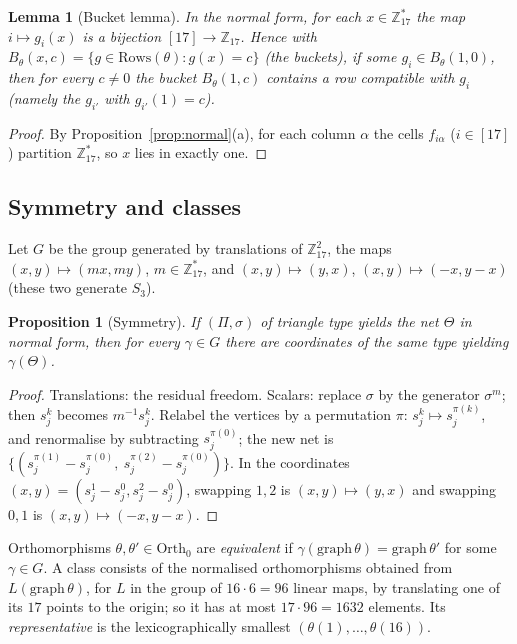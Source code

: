 \documentclass[11pt,a4paper]{article}
\newtheorem{proposition}[theorem]{Proposition}
\newtheorem{lemma}[theorem]{Lemma}
\theoremstyle{definition}
\newcommand{\Zp}{\mathbb{Z}_{17}}
\newcommand{\Zs}{\mathbb{Z}_{17}^{*}}
\newcommand{\Rows}{\mathrm{Rows}}
\newcommand{\Orth}{\mathrm{Orth}}
\begin{document}
\begin{lemma}[Bucket lemma]\label{lem:bucket}
In the normal form, for each $x\in\Zs$ the map $i\mapsto g_i(x)$ is a bijection $[17]\to\Zp$. Hence with $B_\theta(x,c)=\{g\in\Rows(\theta):g(x)=c\}$ (the \emph{buckets}), if some $g_i\in B_\theta(1,0)$, then for every $c\ne0$ the bucket $B_\theta(1,c)$ contains a row compatible with $g_i$ (namely the $g_{i'}$ with $g_{i'}(1)=c$).
\end{lemma}
\begin{proof}
By Proposition~\ref{prop:normal}(a), for each column $\alpha$ the cells $f_{i\alpha}$ ($i\in[17]$) partition $\Zs$, so $x$ lies in exactly one.
\end{proof}

\subsection{Symmetry and classes}

Let $G$ be the group generated by translations of $\Zp^2$, the maps $(x,y)\mapsto(mx,my)$, $m\in\Zs$, and $(x,y)\mapsto(y,x)$, $(x,y)\mapsto(-x,y-x)$ (these two generate $S_3$).

\begin{proposition}[Symmetry]\label{prop:sym}
If $(\Pi,\sigma)$ of triangle type yields the net $\Theta$ in normal form, then for every $\gamma\in G$ there are coordinates of the same type yielding $\gamma(\Theta)$.
\end{proposition}
\begin{proof}
Translations: the residual freedom. Scalars: replace $\sigma$ by the generator $\sigma^m$; then $s^k_j$ becomes $m^{-1}s^k_j$. Relabel the vertices by a permutation $\pi$: $s^k_j\mapsto s^{\pi(k)}_j$, and renormalise by subtracting $s^{\pi(0)}_j$; the new net is $\{(s^{\pi(1)}_j-s^{\pi(0)}_j,\ s^{\pi(2)}_j-s^{\pi(0)}_j)\}$. In the coordinates $(x,y)=(s^1_j-s^0_j,s^2_j-s^0_j)$, swapping $1,2$ is $(x,y)\mapsto(y,x)$ and swapping $0,1$ is $(x,y)\mapsto(-x,y-x)$.
\end{proof}

Orthomorphisms $\theta,\theta'\in\Orth_0$ are \emph{equivalent} if $\gamma(\mathrm{graph}\,\theta)=\mathrm{graph}\,\theta'$ for some $\gamma\in G$. A class consists of the normalised orthomorphisms obtained from $L(\mathrm{graph}\,\theta)$, for $L$ in the group of $16\cdot6=96$ linear maps, by translating one of its $17$ points to the origin; so it has at most $17\cdot96=1632$ elements. Its \emph{representative} is the lexicographically smallest $(\theta(1),\dots,\theta(16))$.
\end{document}
